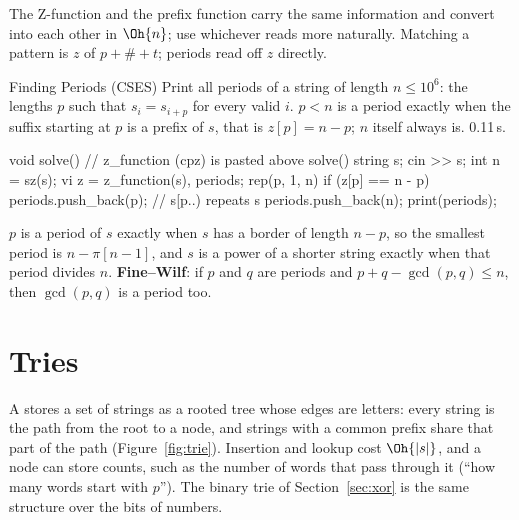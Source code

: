 
The Z-function and the prefix function carry the same information and convert into each other in $\Oh{n}$; use whichever reads more
naturally. Matching a pattern is $z$ of $p + \# + t$; periods read off $z$ directly.

\begin{problem}{Finding Periods (CSES)}
Print all periods of a string of length $n \le 10^6$: the lengths $p$ such that $s_i = s_{i+p}$ for every valid $i$.
\solution $p < n$ is a period exactly when the suffix starting at $p$ is a prefix of $s$, that is $z[p] = n - p$; $n$ itself always is.
0.11\,s.
\end{problem}

\begin{code}
void solve() {  // z_function (cpz) is pasted above solve()
    string s;
    cin >> s;
    int n = sz(s);
    vi z = z_function(s), periods;
    rep(p, 1, n) if (z[p] == n - p) periods.push_back(p);  // s[p..) repeats s
    periods.push_back(n);
    print(periods);
}
\end{code}

\begin{fact}
$p$ is a period of $s$ exactly when $s$ has a border of length $n - p$, so the smallest period is $n - \pi[n-1]$, and $s$ is a power of a
shorter string exactly when that period divides $n$. \textbf{Fine--Wilf}: if $p$ and $q$ are periods and $p + q - \gcd(p, q) \le n$, then
$\gcd(p, q)$ is a period too.
\end{fact}

\section[Tries]{Tries \hfill \gold}\label{sec:trie}

A  stores a set of strings as a rooted tree whose edges are letters: every string is the path from the root to a node, and
strings with a common prefix share that part of the path (Figure~\ref{fig:trie}). Insertion and lookup cost $\Oh{|s|}$, and a node can
store counts, such as the number of words that pass through it (``how many words start with $p$''). The binary trie of
Section~\ref{sec:xor} is the same structure over the bits of numbers.

